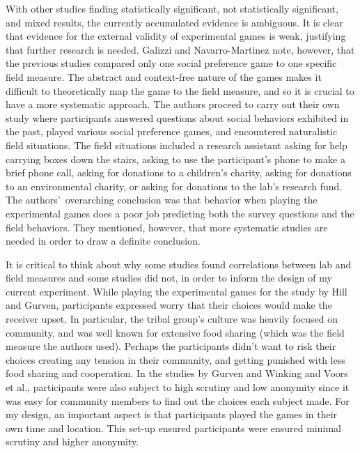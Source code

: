 \documentclass[12pt]{article}
\begin{document}
With other studies finding statistically significant, not statistically significant, and mixed results, the currently accumulated evidence is ambiguous. It is clear that evidence for the external validity of experimental games is weak, justifying that further research is needed. Galizzi and Navarro-Martinez note, however, that the previous studies compared only one social preference game to one specific field measure. The abstract and context-free nature of the games makes it difficult to theoretically map the game to the field measure, and so it is crucial to have a more systematic approach. The authors proceed to carry out their own study where participants answered questions about social behaviors exhibited in the past, played various social preference games, and encountered naturalistic field situations. The field situations included a research assistant asking for help carrying boxes down the stairs, asking to use the participant\rq s phone to make a brief phone call, asking for donations to a children\rq s charity, asking for donations to an environmental charity, or asking for donations to the lab\rq s research fund.  The authors\rq \ overarching conclusion was that behavior when playing the experimental games does a poor job predicting both the survey questions and the field behaviors. They mentioned, however, that more systematic studies are needed in order to draw a definite conclusion.

It is critical to think about why some studies found correlations between lab and field measures and some studies did not, in order to inform the design of my current experiment. While playing the experimental games for the study by Hill and Gurven, participants expressed worry that their choices would make the receiver upset. In particular, the tribal group\rq s culture was heavily focused on community, and was well known for extensive food sharing (which was the field measure the authors used). Perhaps the participants didn\rq t want to risk their choices creating any tension in their community, and getting punished with less food sharing and cooperation. In the studies by Gurven and Winking and Voors et al., participants were also subject to high scrutiny and low anonymity since it was easy for community members to find out the choices each subject made. For my design, an important aspect is that participants played the games in their own time and location. This set-up ensured participants were ensured minimal scrutiny and higher anonymity. 
\end{document}
